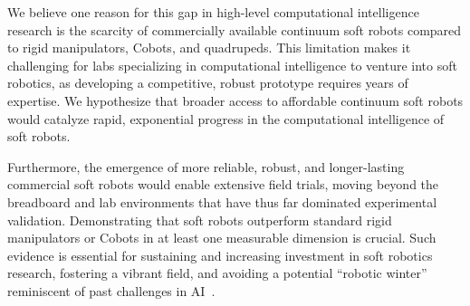 We believe one reason for this gap in high-level computational intelligence research is the scarcity of commercially available continuum soft robots compared to rigid manipulators, \glspl{Cobot}, and quadrupeds. This limitation makes it challenging for labs specializing in computational intelligence to venture into soft robotics, as developing a competitive, robust prototype requires years of expertise. We hypothesize that broader access to affordable continuum soft robots would catalyze rapid, exponential progress in the computational intelligence of soft robots.

Furthermore, the emergence of more reliable, robust, and longer-lasting commercial soft robots would enable extensive field trials, moving beyond the breadboard and lab environments that have thus far dominated experimental validation. Demonstrating that soft robots outperform standard rigid manipulators or \glspl{Cobot} in at least one measurable dimension is crucial. Such evidence is essential for sustaining and increasing investment in soft robotics research, fostering a vibrant field, and avoiding a potential “robotic winter” reminiscent of past challenges in \gls{AI}~\citep{muthukrishnan2020brief}.

